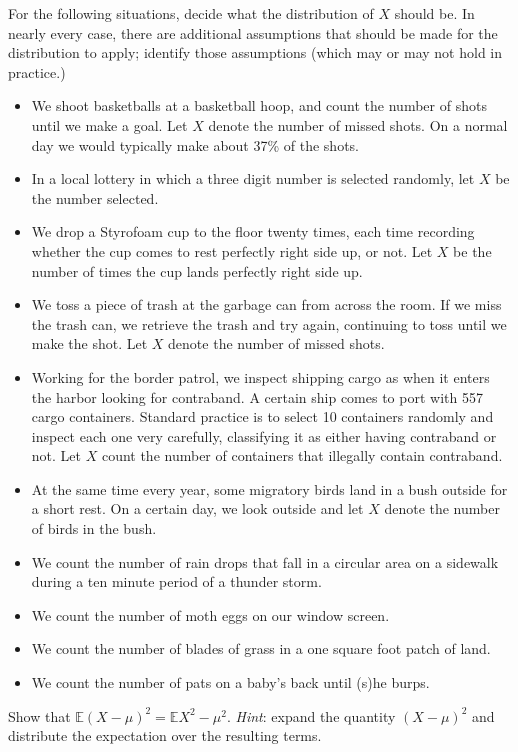 \begin{xca}
For the following situations, decide what the distribution of \(X\)
should be. In nearly every case, there are additional assumptions that
should be made for the distribution to apply; identify those
assumptions (which may or may not hold in practice.)
\begin{itemize}
\item We shoot basketballs at a basketball hoop, and count the number of
shots until we make a goal. Let \(X\) denote the number of missed
shots. On a normal day we would typically make about 37\% of the
shots.
\item In a local lottery in which a three digit number is selected
randomly, let \(X\) be the number selected.
\item We drop a Styrofoam cup to the floor twenty times, each time
recording whether the cup comes to rest perfectly right side up, or
not. Let \(X\) be the number of times the cup lands perfectly right
side up.
\item We toss a piece of trash at the garbage can from across the room. If
we miss the trash can, we retrieve the trash and try again,
continuing to toss until we make the shot. Let \(X\) denote the
number of missed shots.
\item Working for the border patrol, we inspect shipping cargo as when it
enters the harbor looking for contraband. A certain ship comes to
port with 557 cargo containers. Standard practice is to select 10
containers randomly and inspect each one very carefully, classifying
it as either having contraband or not. Let \(X\) count the number of
containers that illegally contain contraband.
\item At the same time every year, some migratory birds land in a bush
outside for a short rest. On a certain day, we look outside and let
\(X\) denote the number of birds in the bush.
\item We count the number of rain drops that fall in a circular area on a
sidewalk during a ten minute period of a thunder storm.
\item We count the number of moth eggs on our window screen.
\item We count the number of blades of grass in a one square foot patch of
land.
\item We count the number of pats on a baby's back until (s)he burps.
\end{itemize}
\end{xca}

\begin{xca}
\label{xca-variance-shortcut} Show that \(\mathbb{E}(X - \mu)^{2} =
\mathbb{E} X^{2} - \mu^{2}\). \emph{Hint}: expand the quantity \((X -
\mu)^{2}\) and distribute the expectation over the resulting terms.
\end{xca}

